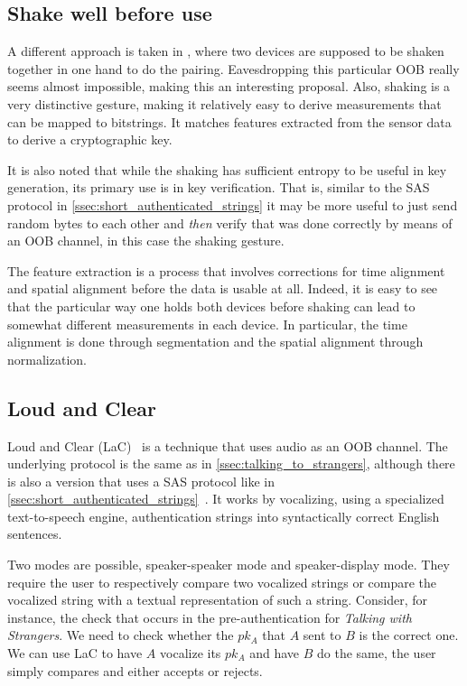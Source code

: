 \documentclass[conference, 11pt]{sty/IEEEtran}
\begin{document}
\subsection{Shake well before use}
A different approach is taken in \cite{mayrhofer2009shake}, where two devices are supposed to be shaken together in one hand to do the pairing.
Eavesdropping this particular OOB really seems almost impossible, making this an interesting proposal.
Also, shaking is a very distinctive gesture, making it relatively easy to derive measurements that can be mapped to bitstrings.
It matches features extracted from the sensor data to derive a cryptographic key.

It is also noted that while the shaking has sufficient entropy to be useful in key generation, its primary use is in key verification.
That is, similar to the SAS protocol in \autoref{ssec:short_authenticated_strings} it may be more useful to just send random bytes to each other and \emph{then} verify that was done correctly by means of an OOB channel, in this case the shaking gesture.

The feature extraction is a process that involves corrections for time alignment and spatial alignment before the data is usable at all.
Indeed, it is easy to see that the particular way one holds both devices before shaking can lead to somewhat different measurements in each device.
In particular, the time alignment is done through segmentation and the spatial alignment through normalization.

\subsection{Loud and Clear}
\label{ssec:loud_and_clear}

Loud and Clear (LaC)~\cite{goodrich2006loud} is a technique that uses audio as an OOB channel.
The underlying protocol is the same as in \autoref{ssec:talking_to_strangers}, although there is also a version that uses a SAS protocol like in \autoref{ssec:short_authenticated_strings}~\cite{kumar2009comparative}.
It works by vocalizing, using a specialized text-to-speech engine, authentication strings into syntactically correct English sentences.

Two modes are possible, speaker-speaker mode and speaker-display mode.
They require the user to respectively compare two vocalized strings or compare the vocalized string with a textual representation of such a string.
Consider, for instance, the check that occurs in the pre-authentication for \emph{Talking with Strangers}.
We need to check whether the $pk_A$ that $A$ sent to $B$ is the correct one.
We can use LaC to have $A$ vocalize its $pk_A$ and have $B$ do the same, the user simply compares and either accepts or rejects.
\end{document}
